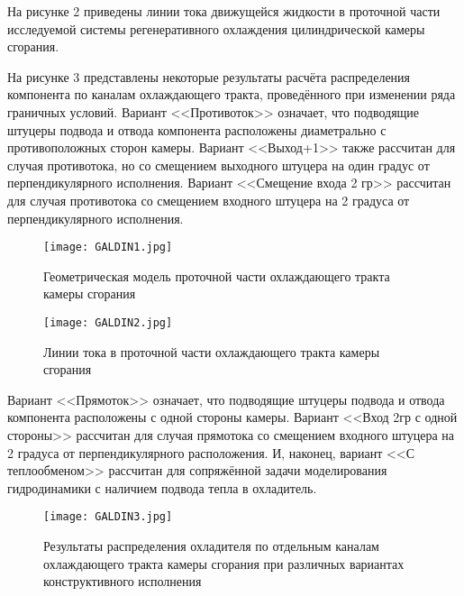 На рисунке 2 приведены линии тока движущейся жидкости в проточной части исследуемой системы регенеративного охлаждения цилиндрической камеры сгорания.

На рисунке 3 представлены некоторые результаты расчёта распределения компонента по каналам охлаждающего тракта,
проведённого при изменении ряда граничных условий.
Вариант <<Противоток>> означает,
что подводящие штуцеры подвода и отвода компонента расположены диаметрально с противоположных сторон камеры.
Вариант <<Выход+1>> также рассчитан для случая противотока,
но со смещением выходного штуцера на один градус от перпендикулярного исполнения.
Вариант <<Смещение входа 2 гр>> рассчитан для случая противотока со смещением входного штуцера на 2 градуса от перпендикулярного исполнения.

\begin{figure}[h!]
	\centering
	\texttt{[image: GALDIN1.jpg]}
	\caption{Геометрическая модель проточной части охлаждающего тракта камеры сгорания}
\end{figure}
\begin{figure}[h!]
	\centering
	\texttt{[image: GALDIN2.jpg]}
	\caption{Линии тока в проточной части охлаждающего тракта камеры сгорания}
\end{figure}

Вариант <<Прямоток>> означает, что подводящие штуцеры подвода и отвода компонента расположены с одной стороны камеры. Вариант <<Вход 2гр с одной стороны>> рассчитан для случая прямотока со смещением входного штуцера на 2 градуса от перпендикулярного расположения. И, наконец, вариант <<С теплообменом>> рассчитан для сопряжённой задачи моделирования гидродинамики с наличием подвода тепла в охладитель.
\begin{figure}[h!]
	\centering
	\texttt{[image: GALDIN3.jpg]}
	\caption{Результаты распределения охладителя по отдельным каналам охлаждающего тракта камеры сгорания при различных вариантах конструктивного исполнения}
\end{figure}

